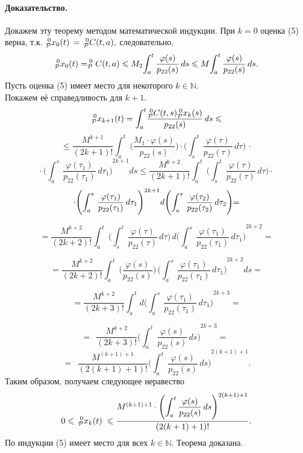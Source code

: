 \paragraph{Доказательство.}
Докажем эту теорему методом математической индукции.
При $k=0$ оценка (5) верна, т.к.\linebreak
$_{\cal P}^{\;0}x_{0}(t) \,= \,_{\cal P}^{\;0}C(t,a),$
следовательно,
$$_{\cal P}^{\;0}x_{0}(t) = _{\cal P}^{\;0}C(t,a)\leqslant M_{2}
{\int_{a}^{t}}\,
\dfrac{\varphi(s)}{p_{22}(s)}\,ds
\leqslant
M
{\int_{a}^{t}}\,
\dfrac{\varphi(s)}{p_{22}(s)}\,ds.
$$
Пусть оценка (5) имеет место для некоторого
$k {\in{\mathbb N}} $.
\\
Покажем её справедливость для $k+1.$
$$
_{\cal P}^{\;0}x_{k+1}(t)=\displaystyle{\int_{a}^{t}}
\dfrac{_{\cal P}^{\;0}C(t,s)_{\cal P}^{\;0}x_{k}(s)}
{p_{22}(s)}\,ds
\leqslant
$$
$$
\leqslant
\dfrac{M^{k+1}}{(2k+1)!}
\displaystyle{\int_{a}^{t}}\,
\Bigg(\dfrac{M_{1}\cdot\varphi(s)}{p_{22}(s)}\Bigg)
\cdot
{\Bigg(\int_{s}^{t}}\,
\dfrac{\varphi(\tau)}{p_{22}(\tau)}\,d\tau\Bigg)\,\cdot
$$
$$
\cdot\,
\displaystyle{\Bigg({\int_{a}^{s}\,
\dfrac{\varphi(\tau_1)}{p_{22}(\tau_1)}\,d\tau_1\Bigg)}
^{2k+1}}
ds
\leqslant
\dfrac{M^{k+2}}{(2k+1)!}
\displaystyle{\int_{a}^{t}}\,
{\Bigg(\int_{s}^{t}}\,
\dfrac{\varphi(\tau)}{p_{22}(\tau)}\,d\tau\Bigg)\cdot
$$
$$
\cdot
\displaystyle{\Bigg({\int_{a}^{s}\,
\dfrac{\varphi(\tau_1)}{p_{22}(\tau_1)}\,d\tau_1\Bigg)}
^{2k+1}}
d
\displaystyle{\Bigg({\int_{a}^{s}\,
\dfrac{\varphi(\tau_2)}{p_{22}(\tau_2)}\,d\tau_2\Bigg)}}
\small{=}
$$

$$
=
\dfrac{M^{k+2}}{(2k+2)!}
\displaystyle{\int_{a}^{t}}\,
{\Bigg(\int_{s}^{t}}\,
\dfrac{\varphi(\tau)}{p_{22}(\tau)}\,d\tau\Bigg)\,
d
\displaystyle{\Bigg({\int_{a}^{s}\,
\dfrac{\varphi(\tau_1)}{p_{22}(\tau_1)}\,d\tau_1\Bigg)}
^{2k+2}}
=
$$

$$
=
\dfrac{M^{k+2}}{(2k+2)!}
\displaystyle{\int_{a}^{t}}\,
\Bigg(
\dfrac{\varphi(s)}{p_{22}(s)}\Bigg)\,
\displaystyle{\Bigg({\int_{a}^{s}\,
\dfrac{\varphi(\tau_1)}{p_{22}(\tau_1)}\,d\tau_1\Bigg)}
^{2k+2}}
ds
=
$$

$$
=
\dfrac{M^{k+2}}{(2k+3)!}
\displaystyle{\int_{a}^{t}}
d
\displaystyle{\Bigg({\int_{a}^{s}\,
\dfrac{\varphi(\tau_1)}{p_{22}(\tau_1)}\,d\tau_1\Bigg)}
^{2k+3}}=
$$

$$
=\;\,
\dfrac{M^{k+2}}{(2k+3)!}
{\displaystyle{\Bigg({\int_{a}^{t}\,
\dfrac{\varphi(s)}{p_{22}(s)}\,ds\Bigg)}
^{2k+3}}}
=\;\,
$$
$$
=\;\,
\dfrac{M^{(k+1)+1}}{(2(k+1)+1)!}
{\displaystyle{\Bigg({\int_{a}^{t}\,
\dfrac{\varphi(s)}{p_{22}(s)}\,ds\Bigg)}
^{2(k+1)+1}}}.
$$
Таким образом, получаем следующее неравество
$$
0 \leqslant \, _{\cal P}^{\;0}x_{k}(t)\; \leqslant
\dfrac{M^{(k+1)+1} \cdot \displaystyle{\Bigg({\int_{a}^{t}}\,
\dfrac{\varphi(s)}{p_{22}(s)}\,ds\Bigg)}
^{2(k+1)+1}_{}} {(2(k+1)+1)!}.
$$
По индукции (5) имеет место для всех $k {\in{\mathbb N}} $.
\;Теорема доказана.
